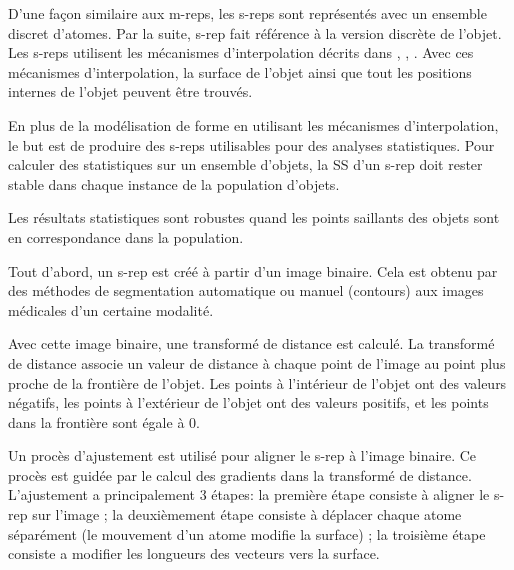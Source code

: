 
D'une façon similaire aux m-reps, les s-reps sont représentés avec un ensemble discret d'atomes.
Par la suite, s-rep fait référence à la version discrète de l'objet.
Les s-reps utilisent les mécanismes d'interpolation décrits dans \cite{damon2003smoothness},
\cite{han2006interpolation}, \cite{damon2008swept}. 
Avec ces mécanismes d'interpolation, la surface de l'objet ainsi que 
tout les positions internes de l'objet peuvent être trouvés.

En plus de la modélisation de forme en utilisant les mécanismes d'interpolation,
le but est de produire des s-reps utilisables pour des analyses statistiques.
Pour calculer des statistiques sur un ensemble d'objets, la SS d'un s-rep doit rester
stable dans chaque instance de la population d'objets.

Les résultats statistiques sont robustes quand les points saillants des objets
sont en correspondance dans la population.

Tout d'abord, un s-rep est créé à partir d'un image binaire.
Cela est obtenu 
par des méthodes de segmentation automatique ou manuel (contours)
aux images médicales d'un certaine modalité.

Avec cette image binaire, une transformé de distance est calculé. La transformé de distance 
associe un valeur de distance à chaque point de l'image au point plus proche de la frontière 
de l'objet. Les points à l'intérieur de l'objet ont des valeurs négatifs, les points
à l'extérieur de l'objet ont des valeurs positifs, et les points dans la frontière sont égale à 0.

Un procès d'ajustement est utilisé
pour aligner le s-rep à l'image binaire. 
Ce procès est guidée par le calcul des gradients dans la transformé de distance.
L'ajustement a principalement 3 étapes:
la première étape consiste à aligner le s-rep sur l'image ;
la deuxièmement étape consiste à déplacer chaque atome séparément (le mouvement d'un atome modifie la surface) ;
la troisième étape consiste a modifier les longueurs des vecteurs vers la surface.

